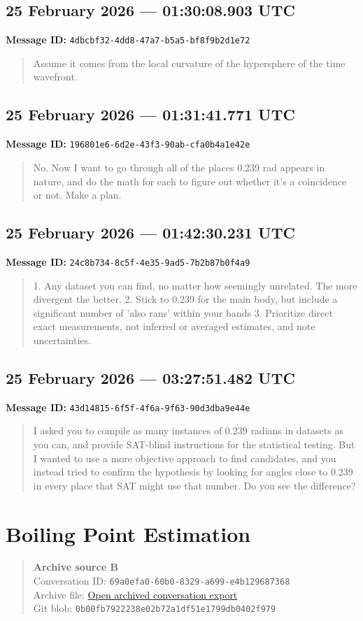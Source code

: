 \documentclass[11pt,letterpaper]{article}
\newcommand{\messageentry}[3]{%
  \Needspace{7\baselineskip}
  \subsection*{#1}
  {\small\textbf{Message ID:} \texttt{#2}}
  \vspace{2pt}
}
\newcommand{\sourceblock}[4]{%
  \begin{quote}\small
  \textbf{#1}\\
  Conversation ID: \texttt{#2}\\
  Archive file: \href{#3}{Open archived conversation export}\\
  Git blob: \texttt{#4}
  \end{quote}
}
\begin{document}
\messageentry{25 February 2026 --- 01:30:08.903 UTC}{4dbcbf32-4dd8-47a7-b5a5-bf8f9b2d1e72}{}
\begin{quote}
Assume it comes from the local curvature of the hypersphere of the time wavefront.
\end{quote}

\messageentry{25 February 2026 --- 01:31:41.771 UTC}{196801e6-6d2e-43f3-90ab-cfa0b4a1e42e}{}
\begin{quote}
No. Now I want to go through all of the places 0.239 rad appears in nature, and do the math for each to figure out whether it's a coincidence or not. Make a plan.
\end{quote}

\messageentry{25 February 2026 --- 01:42:30.231 UTC}{24c8b734-8c5f-4e35-9ad5-7b2b87b0f4a9}{}
\begin{quote}
1. Any dataset you can find, no matter how seemingly unrelated. The more divergent the better. 2. Stick to 0.239 for the main body, but include a significant number of 'also rans' within your bands 3. Prioritize direct exact measurements, not inferred or averaged estimates, and note uncertainties.
\end{quote}

\messageentry{25 February 2026 --- 03:27:51.482 UTC}{43d14815-6f5f-4f6a-9f63-90d3dba9e44e}{}
\begin{quote}
I asked you to compile as many instances of 0.239 radians in datasets as you can, and provide SAT-blind instructions for the statistical testing. But I wanted to use a more objective approach to find candidates, and you instead tried to confirm the hypothesis by looking for angles close to 0.239 in every place that SAT might use that number. Do you see the difference?
\end{quote}

\section*{Boiling Point Estimation}
\sourceblock{Archive source B}{69a0efa0-60b0-8329-a699-e4b129687368}{https://github.com/Satobloc/SAT_THEORY_ARCHIVE_2023-25/blob/main/DEVELOPMENT_FULL_CONVOS/7OCT26_A_GRADE_MINEABLES/26.02.26\%E2\%80\%A226.06.01\%E2\%80\%A2\%5BA\%5D\%20Boiling\%20Point\%20Estimation\%20\%E2\%80\%94\%20raw.json}{0b00fb79\hspace{0pt}22238e02\hspace{0pt}b72a1df5\hspace{0pt}1e1799db\hspace{0pt}0402f979}
\end{document}
